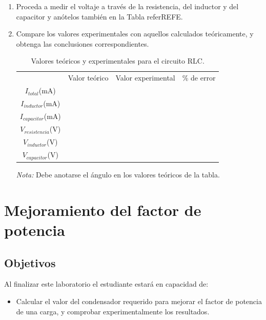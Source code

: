 \documentclass[12pt,letterpaper]{report}
\newcommand{\obj}{Objetivos}
\newcommand{\capacidad}{Al finalizar este laboratorio el estudiante estará en capacidad de:}
\begin{document}
\begin{enumerate}
\emph{Nota:} Asegúrese de apagar el generador de audio cada vez que cambie la ubicación del multímetro digital, para ponerlo en serie con el elemento siguiente.
\item Proceda a medir el voltaje a través de la resistencia, del inductor y del capacitor y anótelos también en la Tabla referREFE.
\item Compare los valores experimentales con aquellos calculados teóricamente, y obtenga las conclusiones correspondientes.

\begin{table}[H]
	\caption{Valores teóricos y experimentales para el circuito RLC.}
	\label{tab:L11T2}
	\centering
	\begin{tabular}[h]{|c|c|c|c|}
		\cline{2-4}
		\multicolumn{1}{c|}{} &
		\multicolumn{1}{c|}{Valor teórico} &
		\multicolumn{1}{c|}{Valor experimental} &
		\multicolumn{1}{c|}{\% de error}\\
		
		$I_{total}$(mA) & {} & {} & {} \\
		
		$I_{inductor}$(mA) & {} & {} & {} \\
		
		$I_{capacitor}$(mA) & {} & {} & {} \\
		
		$V_{resistencia}$(V) & {} & {} & {} \\
		
		$V_{inductor}$(V) & {} & {} & {} \\
		
		$V_{capacitor}$(V) & {} & {} & {} \\
		
	\end{tabular}
\begin{flushleft}
\emph{Nota:} Debe anotarse el ángulo en los valores teóricos de la tabla.
\end{flushleft}
\end{table}
\end{enumerate}

\chapter{Mejoramiento del factor de potencia}
\section{\obj}
\capacidad
\begin{itemize}
\item Calcular el valor del condensador requerido para mejorar el factor de potencia de una carga, y comprobar experimentalmente los resultados.
\end{itemize}
\end{document}
